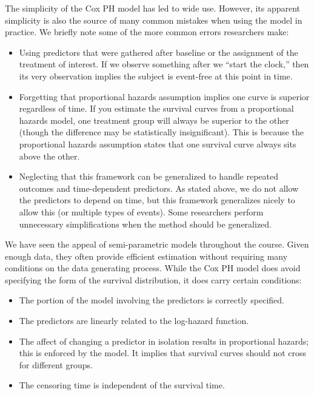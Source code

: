\documentclass[
]{book}
\providecommand{\tightlist}{%
  \setlength{\itemsep}{0pt}\setlength{\parskip}{0pt}}
\theoremstyle{plain}
\theoremstyle{mydefn}
\theoremstyle{myexmpl}
\theoremstyle{remark}
\begin{document}
The simplicity of the Cox PH model has led to wide use. However, its apparent simplicity is also the source of many common mistakes when using the model in practice. We briefly note some of the more common errors researchers make:

\begin{itemize}
\tightlist
\item
  Using predictors that were gathered after baseline or the assignment of the treatment of interest. If we observe something after we ``start the clock,'' then its very observation implies the subject is event-free at this point in time.
\item
  Forgetting that proportional hazards assumption implies one curve is superior regardless of time. If you estimate the survival curves from a proportional hazards model, one treatment group will always be superior to the other (though the difference may be statistically insignificant). This is because the proportional hazards assumption states that one survival curve always sits above the other.
\item
  Neglecting that this framework can be generalized to handle repeated outcomes and time-dependent predictors. As stated above, we do not allow the predictors to depend on time, but this framework generalizes nicely to allow this (or multiple types of events). Some researchers perform unnecessary simplifications when the method should be generalized.
\end{itemize}

We have seen the appeal of semi-parametric models throughout the course. Given enough data, they often provide efficient estimation without requiring many conditions on the data generating process. While the Cox PH model does avoid specifying the form of the survival distribution, it does carry certain conditions:

\begin{itemize}
\tightlist
\item
  The portion of the model involving the predictors is correctly specified.
\item
  The predictors are linearly related to the log-hazard function.
\item
  The affect of changing a predictor in isolation results in proportional hazards; this is enforced by the model. It implies that survival curves should not cross for different groups.
\item
  The censoring time is independent of the survival time.
\end{itemize}
\end{document}
